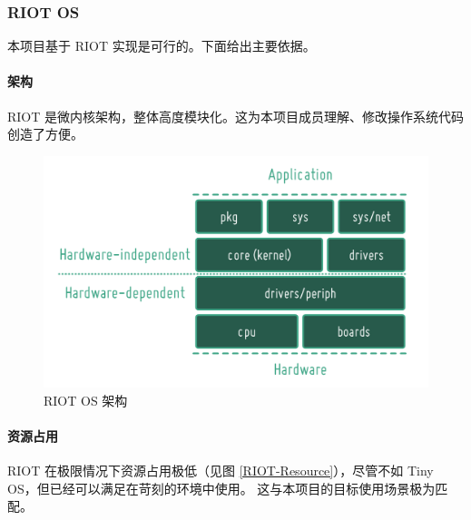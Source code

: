\documentclass{ctexart}
\begin{document}
\subsubsection{RIOT OS}
本项目基于 RIOT 实现是可行的。下面给出主要依据。

\paragraph{架构}
RIOT 是微内核架构，整体高度模块化。这为本项目成员理解、修改操作系统代码创造了方便。

\begin{figure}
	\includegraphics[width=\textwidth]{RIOT-Overview.png}
	\caption{RIOT OS 架构}
	\label{RIOT-Overview}
\end{figure}

\paragraph{资源占用}
RIOT 在极限情况下资源占用极低（见图 \ref{RIOT-Resource}），尽管不如 Tiny OS，但已经可以满足在苛刻的环境中使用。
这与本项目的目标使用场景极为匹配。
\end{document}
